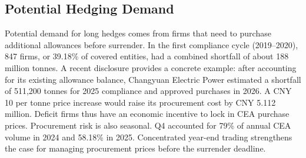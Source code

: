 \documentclass[10pt,a4paper,twocolumn]{article}
\begin{document}
\subsection{Potential Hedging Demand}
Potential demand for long hedges comes from firms that need to purchase additional allowances before surrender. In the first compliance cycle (2019--2020), 847 firms, or 39.18\% of covered entities, had a combined shortfall of about 188 million tonnes\cite{mee2022compliance}. A recent disclosure provides a concrete example: after accounting for its existing allowance balance, Changyuan Electric Power estimated a shortfall of 511,200 tonnes for 2025 compliance and approved purchases in 2026\cite{changyuan2026purchase}. A CNY 10 per tonne price increase would raise its procurement cost by CNY 5.112 million. Deficit firms thus have an economic incentive to lock in CEA purchase prices.
Procurement risk is also seasonal. Q4 accounted for 79\% of annual CEA volume in 2024\cite{mee2025development} and 58.18\% in 2025\cite{she2025daily}. Concentrated year-end trading strengthens the case for managing procurement prices before the surrender deadline.
\end{document}
